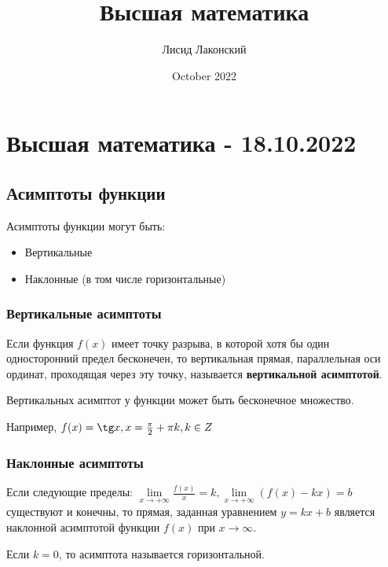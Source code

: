 \documentclass{article}
\title{Высшая математика}
\author{Лисид Лаконский}
\date{October 2022}
\begin{document}
\maketitle

\tableofcontents
\pagebreak

\section{Высшая математика - 18.10.2022}

\subsection{Асимптоты функции}

\begin{flushleft}

Асимптоты функции могут быть:
\begin{itemize}
    \item Вертикальные
    \item Наклонные (в том числе горизонтальные)
\end{itemize}

\subsubsection{Вертикальные асимптоты}

Если функция $f(x)$ имеет точку разрыва, в которой хотя бы один односторонний предел бесконечен, то вертикальная прямая, параллельная оси ординат, проходящая через эту точку, называется \textbf{вертикальной асимптотой}.

\hfill

Вертикальных асимптот у функции может быть бесконечное множество.

\hfill

Например, $f(x) = \tg x, x = \frac{\pi}{2} + \pi k, k \in Z$

\subsubsection{Наклонные асимптоты}

Если следующие пределы: $\lim\limits_{x \to +\infty} \frac{f(x)}{x} = k, \lim\limits_{x \to +\infty} (f(x) - k x) = b$ существуют и конечны, то прямая, заданная уравнением $y = k x + b$ является наклонной асимптотой функции $f(x)$ при $x \to \infty$.

\hfill

Если $k = 0$, то асимптота называется горизонтальной.


\end{flushleft}
\end{document}
